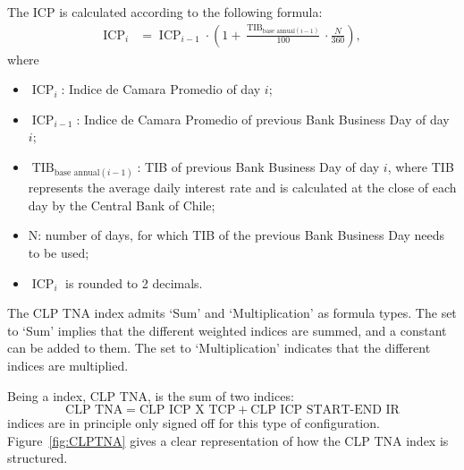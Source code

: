 \documentclass[]{pmv_report} %
\DeclareMathOperator{\ICP}{ICP}
\DeclareMathOperator{\TIB}{TIB}
\begin{document}
The ICP is calculated according to the following formula:
\begin{align}
  \ICP_i
    &= \ICP_{i-1} \cdot \left( 1 + \frac{\TIB_{\text{base annual}(i-1)}}{100} \cdot \frac{N}{360} \right), \label{eq:ICP}
\end{align}
where
\begin{itemize}
  \item $\ICP_i$: Indice de Camara Promedio of day $i$;
  \item $\ICP_{i-1}$: Indice de Camara Promedio of previous Bank Business Day of day $i$;
  \item $\TIB_{\text{base annual}(i-1)}$: TIB of previous Bank Business Day of day $i$, where TIB represents the average daily interest rate and is calculated at the close of each day by the Central Bank of Chile;
  \item N: number of days, for which TIB of the previous Bank Business Day needs to be used;
  \item $\ICP_i$ is rounded to 2 decimals.
\end{itemize}

The CLP TNA  index admits `Sum' and `Multiplication' as formula types.
The  set to `Sum' implies that the different weighted indices are summed, and a constant can be added to them.
The  set to `Multiplication' indicates that the different indices are multiplied.

Being a  index, CLP TNA, is the sum of two indices:
$$ \text{CLP TNA} = \text{CLP ICP X TCP} + \text{CLP ICP START-END IR} $$
 indices are in principle only signed off for this type of configuration.
Figure~\ref{fig:CLPTNA} gives a clear representation of how the CLP TNA index is structured.
\end{document}

